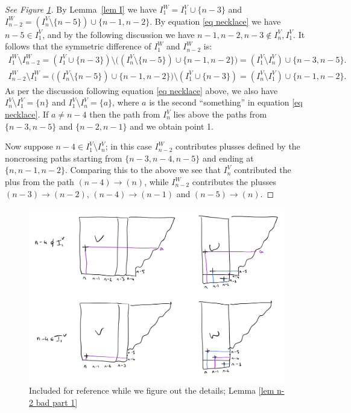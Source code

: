\documentclass[11pt]{article}
\theoremstyle{remark}
\theoremstyle{definition}
\begin{document}
  \begin{proof}
[See Figure \ref{fig new le diagrams}]

By Lemma~\ref{lem I} we have $I_1^W = I_1^V\cup \{n-3\}$ and $I_{n-2}^W = (I_n^V \setminus \{n-5\}) \cup \{n-1,n-2\}$. By equation \eqref{eq necklace} we have $n-5 \in I_1^V$, and by the following discussion we have $n-1,n-2,n-3 \not\in I_n^V,I_1^V$. It follows that the symmetric difference of $I_1^W$ and $I_{n-2}^W$ is:
    \begin{gather*}
    I_1^W \setminus I_{n-2}^W = (I_1^V\cup\{n-3\}) \setminus \big((I_n^V\setminus \{n-5\})\cup \{n-1, n-2\}\big) = (I_1^V\setminus I_n^V) \cup \{n-3, n-5\}. \\
    I_{n-2}^W \setminus I_1^W = \big((I_n^V\setminus \{n-5\})\cup \{n-1, n-2\}\big) \setminus(I_1^V\cup\{n-3\}) = (I_n^V\setminus I_1^V) \cup \{n-1, n-2\}.
\end{gather*}
As per the discussion following equation \eqref{eq necklace} above, we also have $I_n^V\setminus I_1^V = \{n\}$ and $I_1^V\setminus I_n^V = \{a\}$, where $a$ is the second ``something'' in equation \eqref{eq necklace}. If $a \neq n-4$ then the path from $I_n^V$ lies above the paths from $\{n-3, n-5\}$ and $\{n-2, n-1\}$ and we obtain point 1.
    
Now suppose $n-4\in I_1^V\setminus I_{n}^V$; in this case $I_{n-2}^W$ contributes plusses defined by the noncrossing paths starting from $\{n-3, n-4, n-5\}$ and ending at $\{n, n-1, n-2\}$.  Comparing this to the above we see that $I_n^V$ contributed the plus from the path $(n-4)\rightarrow (n)$, while $I_{n-2}^W$ contributes the plusses $(n-3)\rightarrow (n-2)$, $(n-4)\rightarrow (n-1)$ and $(n-5)\rightarrow (n)$.
  \end{proof}
  
  \begin{figure}
\includegraphics[width = 12cm]{new_le_diagrams.jpg}
\caption{Included for reference while we figure out the details; Lemma \ref{lem n-2 bad part 1}}\label{fig new le diagrams}
  \end{figure}
\end{document}
